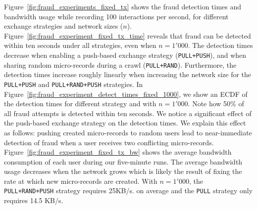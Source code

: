 
Figure~\ref{fig:fraud_experiments_fixed_tx} shows the fraud detection times and bandwidth usage while recording 100 interactions per second, for different exchange strategies and network sizes ($ n $).
Figure~\ref{fig:fraud_experiment_fixed_tx_time} reveals that fraud can be detected within ten seconds under all strategies, even when $ n = 1'000 $.
The detection times decrease when enabling a push-based exchange strategy (\texttt{PULL+PUSH}), and when sharing random micro-records during a crawl (\texttt{PULL+RAND}).
Furthermore, the detection times increase roughly linearly when increasing the network size for the \texttt{PULL+PUSH} and \texttt{PULL+RAND+PUSH} strategies.
In Figure~\ref{fig:fraud_experiment_detect_times_fixed_1000}, we show an ECDF of the detection times for different strategy and with $ n = 1'000 $.
Note how 50\% of all fraud attempts is detected within ten seconds.
We notice a significant effect of the push-based exchange strategy on the detection times.
We explain this effect as follows: pushing created micro-records to random users lead to near-immediate detection of fraud when a user receives two conflicting micro-records.
Figure~\ref{fig:fraud_experiment_fixed_tx_bw} shows the average bandwidth consumption of each user during our five-minute runs.
The average bandwidth usage decreases when the network grows which is likely the result of fixing the rate at which new micro-records are created.
With $ n = 1'000 $, the \texttt{PULL+RAND+PUSH} strategy requires 25KB/s. on average and the \texttt{PULL} strategy only requires 14.5 KB/s.

